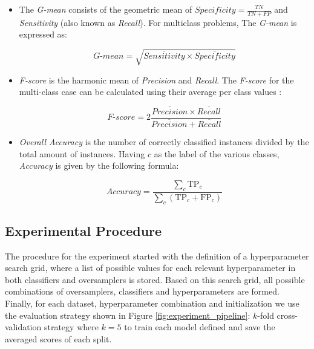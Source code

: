 \documentclass[preprint,12pt]{elsarticle}
\begin{document}
\begin{itemize}
    \item The \textit{G-mean} consists of the geometric mean of $Specificity =
        \frac{TN}{TN + FP}$ and \textit{Sensitivity} (also known as
        \textit{Recall}). For multiclass problems, The \textit{G-mean} is
        expressed as:

        $$\textit{G-mean} = \sqrt{ \overline{Sensitivity} \times
        \overline{Specificity}}$$

    \item \textit{F-score} is the harmonic mean of \textit{Precision} and
        \textit{Recall}. The \textit{F-score} for the multi-class case can be
        calculated using their average per class values \cite{He2009}:

          $$\textit{F-score}=2\frac{\overline{Precision} \times
          \overline{Recall}}{\overline{Precision} + \overline{Recall}}$$

    \item \textit{Overall Accuracy} is the number of correctly classified
        instances divided by the total amount of instances. Having \( c \) as
        the label of the various classes, \textit{Accuracy} is given by the
        following formula:

	      $$\textit{Accuracy} = \frac{ \sum\limits_{c}{ \text{TP}_{c} } }{
			      \sum\limits_{c}{ (\text{TP}_{c}  + \text{FP}_{c}) } } $$

\end{itemize}

\subsection{Experimental Procedure}

The procedure for the experiment started with the definition of a
hyperparameter search grid, where a list of possible values for each relevant
hyperparameter in both classifiers and oversamplers is stored. Based on this
search grid, all possible combinations of oversamplers, classifiers and
hyperparameters are formed.  Finally, for each dataset, hyperparameter
combination and initialization we use the evaluation strategy shown in Figure
\ref{fig:experiment_pipeline}: $k$-fold cross-validation strategy where $k=5$
to train each model defined and save the averaged scores of each split.
\end{document}
